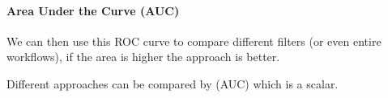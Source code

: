 \documentclass[letterpaper,10pt,english]{sphinxmanual}
\begin{document}
\begin{sphinxVerbatim}[commandchars=\\\{\}]
   
 
 
\end{sphinxVerbatim}

\noindent{}


\paragraph{Area Under the Curve (AUC)}
\label{\detokenize{04-BasicSegmentation_Part2:area-under-the-curve-auc}}
\sphinxAtStartPar
We can then use this ROC curve to compare different filters (or even entire workflows), if the area is higher the approach is better.

\sphinxAtStartPar
Different approaches can be compared by  (AUC) which is a scalar.
\end{document}
